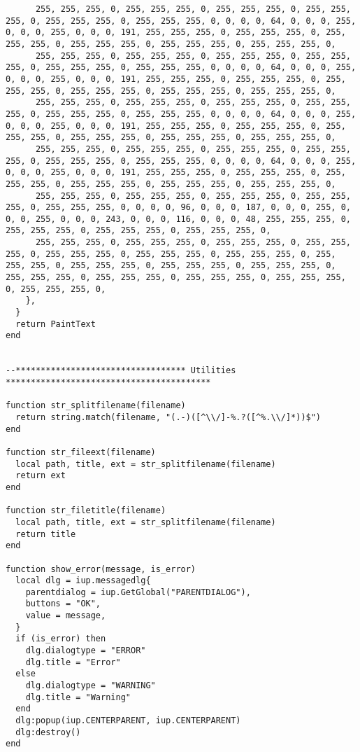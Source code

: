 \documentclass{ctexart}
\begin{document}
\begin{lstlisting}
      255, 255, 255, 0, 255, 255, 255, 0, 255, 255, 255, 0, 255, 255, 255, 0, 255, 255, 255, 0, 255, 255, 255, 0, 0, 0, 0, 64, 0, 0, 0, 255, 0, 0, 0, 255, 0, 0, 0, 191, 255, 255, 255, 0, 255, 255, 255, 0, 255, 255, 255, 0, 255, 255, 255, 0, 255, 255, 255, 0, 255, 255, 255, 0, 
      255, 255, 255, 0, 255, 255, 255, 0, 255, 255, 255, 0, 255, 255, 255, 0, 255, 255, 255, 0, 255, 255, 255, 0, 0, 0, 0, 64, 0, 0, 0, 255, 0, 0, 0, 255, 0, 0, 0, 191, 255, 255, 255, 0, 255, 255, 255, 0, 255, 255, 255, 0, 255, 255, 255, 0, 255, 255, 255, 0, 255, 255, 255, 0, 
      255, 255, 255, 0, 255, 255, 255, 0, 255, 255, 255, 0, 255, 255, 255, 0, 255, 255, 255, 0, 255, 255, 255, 0, 0, 0, 0, 64, 0, 0, 0, 255, 0, 0, 0, 255, 0, 0, 0, 191, 255, 255, 255, 0, 255, 255, 255, 0, 255, 255, 255, 0, 255, 255, 255, 0, 255, 255, 255, 0, 255, 255, 255, 0, 
      255, 255, 255, 0, 255, 255, 255, 0, 255, 255, 255, 0, 255, 255, 255, 0, 255, 255, 255, 0, 255, 255, 255, 0, 0, 0, 0, 64, 0, 0, 0, 255, 0, 0, 0, 255, 0, 0, 0, 191, 255, 255, 255, 0, 255, 255, 255, 0, 255, 255, 255, 0, 255, 255, 255, 0, 255, 255, 255, 0, 255, 255, 255, 0, 
      255, 255, 255, 0, 255, 255, 255, 0, 255, 255, 255, 0, 255, 255, 255, 0, 255, 255, 255, 0, 0, 0, 0, 96, 0, 0, 0, 187, 0, 0, 0, 255, 0, 0, 0, 255, 0, 0, 0, 243, 0, 0, 0, 116, 0, 0, 0, 48, 255, 255, 255, 0, 255, 255, 255, 0, 255, 255, 255, 0, 255, 255, 255, 0, 
      255, 255, 255, 0, 255, 255, 255, 0, 255, 255, 255, 0, 255, 255, 255, 0, 255, 255, 255, 0, 255, 255, 255, 0, 255, 255, 255, 0, 255, 255, 255, 0, 255, 255, 255, 0, 255, 255, 255, 0, 255, 255, 255, 0, 255, 255, 255, 0, 255, 255, 255, 0, 255, 255, 255, 0, 255, 255, 255, 0, 255, 255, 255, 0, 
    },
  }
  return PaintText
end


--********************************** Utilities *****************************************

function str_splitfilename(filename)
  return string.match(filename, "(.-)([^\\/]-%.?([^%.\\/]*))$")
end

function str_fileext(filename)
  local path, title, ext = str_splitfilename(filename)
  return ext
end

function str_filetitle(filename)
  local path, title, ext = str_splitfilename(filename)
  return title
end

function show_error(message, is_error)
  local dlg = iup.messagedlg{
    parentdialog = iup.GetGlobal("PARENTDIALOG"),
    buttons = "OK",
    value = message,
  }
  if (is_error) then
    dlg.dialogtype = "ERROR"
    dlg.title = "Error"
  else
    dlg.dialogtype = "WARNING"
    dlg.title = "Warning"
  end
  dlg:popup(iup.CENTERPARENT, iup.CENTERPARENT)
  dlg:destroy()
end


\end{lstlisting}
\end{document}
